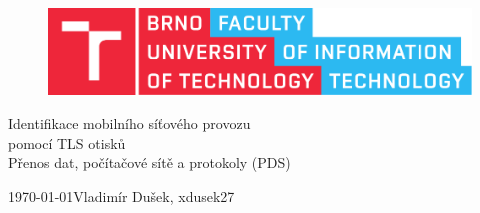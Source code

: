 \documentclass[12pt,a4paper]{article}
\begin{document}
\begin{titlepage}
    \begin{center}


        \begin{figure}[htb]
            \centering
            \includegraphics[width=0.85\hsize]{fitlogo.pdf}
        \end{figure}


        {\Huge Identifikace mobilního síťového provozu} \\
        \bigskip
        {\Huge pomocí TLS otisků} \\
        \bigskip
        \bigskip
        {\LARGE Přenos dat, počítačové sítě a protokoly (PDS)   }

    \end{center}

    {\Large \today \hfill Vladimír Dušek, xdusek27}

\end{titlepage}



\tableofcontents
\newpage

\end{document}
